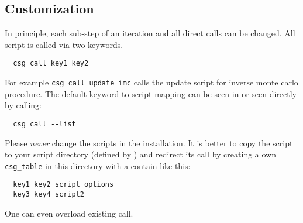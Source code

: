 \subsection{Customization}
In principle, each sub-step of an iteration and all direct calls can be changed. 
All script is called via two keywords.
\begin{verbatim}
  csg_call key1 key2
\end{verbatim} 
For example \texttt{csg\_call update imc} calls the update script for inverse monte carlo procedure.
The default keyword to script mapping can be seen in  or seen directly by calling:
\begin{verbatim}
  csg_call --list
\end{verbatim} 

Please {\em never} change the scripts in the \votca installation. It is better to copy the script to your script directory (defined by ) and redirect its call by creating a own \texttt{csg\_table} in this directory with a contain like this:
\begin{verbatim}
  key1 key2 script options
  key3 key4 script2
\end{verbatim} 
One can even overload existing call.

